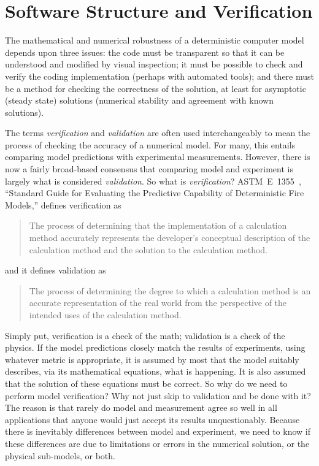
\chapter{Software Structure and Verification}

The mathematical and numerical robustness of a deterministic computer model depends upon
three issues: the code must be transparent so that it can be understood and modified by visual
inspection; it must be possible to check and verify the coding implementation (perhaps with automated tools); and there must be a
method for checking the correctness of the solution, at least for asymptotic (steady state)
solutions (numerical stability and agreement with known solutions).

The terms {\em verification} and {\em validation} are often used interchangeably to mean the process of checking the
accuracy of a numerical model. For many, this entails comparing model predictions with experimental measurements. However,
there is now a fairly broad-based consensus that comparing model and experiment is largely what is considered {\em validation}. So what is
{\em verification}? ASTM~E~1355~\cite{ASTM:E1355}, ``Standard Guide for
Evaluating the Predictive Capability of Deterministic Fire Models,'' defines verification as
\begin{quote}
The process of determining that the implementation of a calculation method accurately
represents the developer's conceptual description of the calculation method and the solution to the calculation method.
\end{quote}
and it defines validation as
\begin{quote}
The process of determining the degree to which a calculation method is an accurate representation of the real world
from the perspective of the intended uses of the calculation method.
\end{quote}
Simply put, verification is a check of the math; validation is a check of the physics. If the model predictions closely match
the results of experiments, using whatever metric is appropriate, it is assumed by most that the model suitably describes, via
its mathematical equations, what is happening. It is also assumed that the solution of these equations must be correct. So why do
we need to perform model verification? Why not just skip to validation and be done with it? The reason is that rarely do model and
measurement agree so well in all applications that anyone would just accept its results unquestionably. Because there is
inevitably differences between model and experiment, we need to know if these differences are due to limitations or errors in
the numerical solution, or the physical sub-models, or both.

